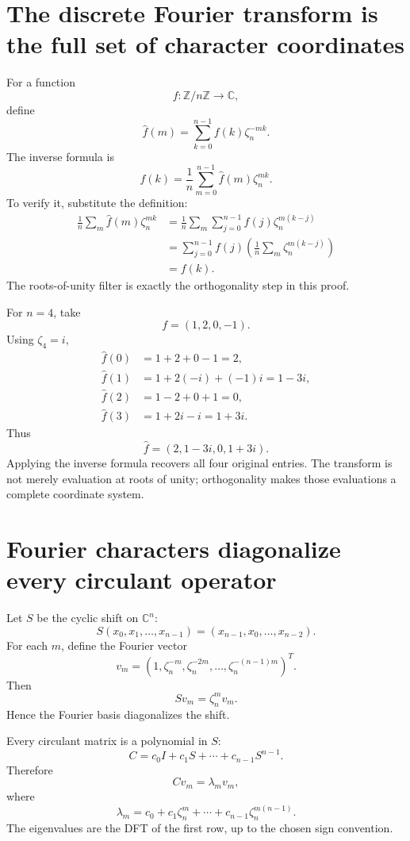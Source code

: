 \section{The discrete Fourier transform is the full set of character coordinates}

For a function
\[
  f:\mathbb Z/n\mathbb Z\to\mathbb C,
\]
define
\[
  \widehat f(m)
  =\sum_{k=0}^{n-1}
  f(k)\zeta_n^{-mk}.
\]
The inverse formula is
\[
  \boxed{
  f(k)=\frac1n
  \sum_{m=0}^{n-1}
  \widehat f(m)\zeta_n^{mk}.}
\]
To verify it, substitute the definition:
\[
\begin{aligned}
  \frac1n\sum_m\widehat f(m)\zeta_n^{mk}
  &=\frac1n
    \sum_m\sum_{j=0}^{n-1}
    f(j)\zeta_n^{m(k-j)}\\
  &=\sum_{j=0}^{n-1}f(j)
    \left(
    \frac1n\sum_m\zeta_n^{m(k-j)}
    \right)\\
  &=f(k).
\end{aligned}
\]
The roots-of-unity filter is exactly the orthogonality step in this proof.

For \(n=4\), take
\[
  f=(1,2,0,-1).
\]
Using \(\zeta_4=i\),
\[
\begin{aligned}
  \widehat f(0)&=1+2+0-1=2,\\
  \widehat f(1)&=1+2(-i)+(-1)i=1-3i,\\
  \widehat f(2)&=1-2+0+1=0,\\
  \widehat f(3)&=1+2i-i=1+3i.
\end{aligned}
\]
Thus
\[
  \widehat f=(2,1-3i,0,1+3i).
\]
Applying the inverse formula recovers all four original entries.  The transform is not merely evaluation at roots of unity; orthogonality makes those evaluations a complete coordinate system.

\section{Fourier characters diagonalize every circulant operator}

Let \(S\) be the cyclic shift on \(\mathbb C^n\):
\[
  S(x_0,x_1,\ldots,x_{n-1})
  =(x_{n-1},x_0,\ldots,x_{n-2}).
\]
For each \(m\), define the Fourier vector
\[
  v_m=
  (1,\zeta_n^{-m},\zeta_n^{-2m},\ldots,
  \zeta_n^{-(n-1)m})^T.
\]
Then
\[
  Sv_m=\zeta_n^m v_m.
\]
Hence the Fourier basis diagonalizes the shift.

Every circulant matrix is a polynomial in \(S\):
\[
  C=c_0I+c_1S+\cdots+c_{n-1}S^{n-1}.
\]
Therefore
\[
  Cv_m=\lambda_m v_m,
\]
where
\[
  \lambda_m
  =c_0+c_1\zeta_n^m+\cdots+c_{n-1}\zeta_n^{m(n-1)}.
\]
The eigenvalues are the DFT of the first row, up to the chosen sign convention.


